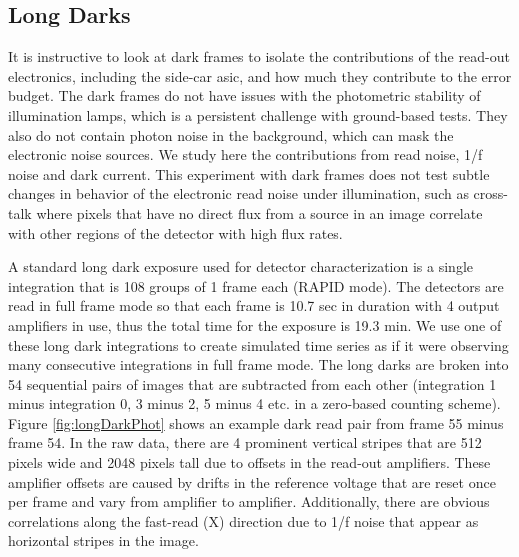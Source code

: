 \documentclass{aastex62}
\begin{document}
\clearpage
\subsection{Long Darks}\label{sec:longDarks}

It is instructive to look at dark frames to isolate the contributions of the read-out electronics, including the side-car asic, and how much they contribute to the error budget.
The dark frames do not have issues with the photometric stability of illumination lamps, which is a persistent challenge with ground-based tests.
They also do not contain photon noise in the background, which can mask the electronic noise sources.
We study here the contributions from read noise, 1/f noise and dark current.
This experiment with dark frames does not test subtle changes in behavior of the electronic read noise under illumination, such as cross-talk where pixels that have no direct flux from a source in an image correlate with other regions of the detector with high flux rates.

A standard long dark exposure used for detector characterization is a single integration that is 108 groups of 1 frame each (RAPID mode).
The detectors are read in full frame mode so that each frame is 10.7 sec in duration with 4 output amplifiers in use, thus the total time for the exposure is 19.3 min.
We use one of these long dark integrations to create simulated time series as if it were observing many consecutive integrations in full frame mode.
The long darks are broken into 54 sequential pairs of images that are subtracted from each other (integration 1 minus integration 0, 3 minus 2, 5 minus 4 etc. in a zero-based counting scheme).
Figure \ref{fig:longDarkPhot} shows an example dark read pair from frame 55 minus frame 54.
In the raw data, there are 4 prominent vertical stripes that are 512 pixels wide and 2048 pixels tall due to offsets in the read-out amplifiers.
These amplifier offsets are caused by drifts in the reference voltage that are reset once per frame and vary from amplifier to amplifier.
Additionally, there are obvious correlations along the fast-read (X) direction due to 1/f noise that appear as horizontal stripes in the image.
\end{document}
